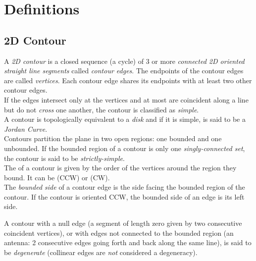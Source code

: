 
\section{Definitions}

\subsection{2D Contour}

A {\em 2D contour} is a closed sequence (a cycle) of 3 or more \textit{connected 2D oriented straight line segments} called {\em contour edges}. The endpoints of the contour edges are called {\em vertices}. Each contour edge shares its endpoints with at least two other contour edges.\\
If the edges intersect only at the vertices and at most are coincident along a line but do not {\em cross} one another, the contour is classified as {\em simple}.\\
A contour is topologically equivalent to a \textit{disk} and if it is simple, is said to be a \textit{Jordan Curve}.\\
Contours partition the plane in two open regions: one bounded and one unbounded. If the bounded region of a contour is only one \textit{singly-connected set}, the contour is said to be {\em strictly-simple}.\\
The  of a contour is given by the order of the vertices around the region they bound. It can be  (CCW) or  (CW).\\
The {\em bounded side} of a contour edge is the side facing the bounded region of the contour. If the contour is oriented CCW, the bounded side of an edge is its left side.

A contour with a null edge (a segment of length zero given by two consecutive coincident vertices), or with edges not connected to the bounded region (an antenna: 2 consecutive edges going forth and back along the same line), is said to be {\em degenerate} (collinear edges are \textit{not} considered a degeneracy).

